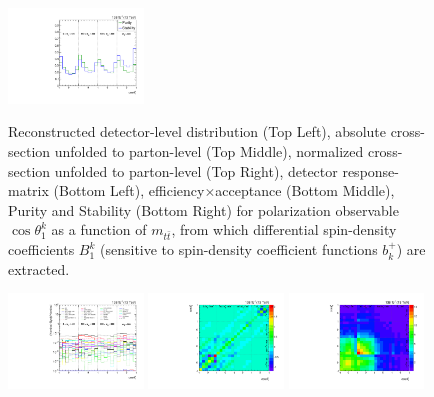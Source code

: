 \begin{refsection}
\begin{figure}[htb]
\begin{center}
 \includegraphics[width=0.32\textwidth]{fig_fullRun2UL/unfolding/combined/PurStab_b1k_mttbar.pdf} \\
\caption{Reconstructed detector-level distribution (Top Left), absolute cross-section unfolded to parton-level (Top Middle), normalized cross-section unfolded to parton-level (Top Right), detector response-matrix (Bottom Left), efficiency$\times$acceptance (Bottom Middle), Purity and Stability (Bottom Right) for polarization observable $\cos\theta_{1}^{k}$ as a function of $m_{t\bar{t}}$, from which differential spin-density coefficients $B_{1}^{k}$ (sensitive to spin-density coefficient functions $b_k^{+}$) are extracted.}
\label{fig:b1k_mttbar}
\end{center}
\end{figure}
\clearpage
\begin{figure}[htb]
\begin{center}
 \includegraphics[width=0.32\textwidth]{fig_fullRun2UL/unfolding/combined/deltaSystCombinedlog_rebinnedB_b1k_mttbar.pdf}
 \includegraphics[width=0.32\textwidth]{fig_fullRun2UL/unfolding/combined/StatCovMatrix_rebinnedB_b1k_mttbar.pdf}
 \includegraphics[width=0.32\textwidth]{fig_fullRun2UL/unfolding/combined/TotalSystCovMatrix_rebinnedB_b1k_mttbar.pdf} \\

\end{center}
\end{figure}
\end{refsection}
